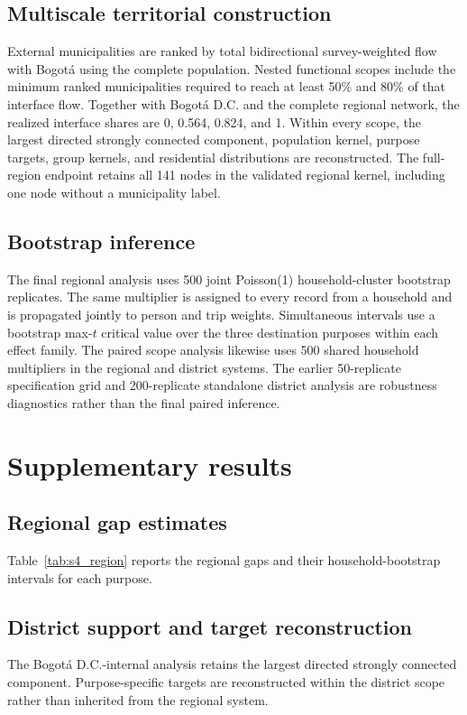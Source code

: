 \documentclass[11pt]{article}
\begin{document}



\subsection{Multiscale territorial construction}
External municipalities are ranked by total bidirectional survey-weighted flow with
Bogotá using the complete population. Nested functional scopes include the minimum
ranked municipalities required to reach at least 50\% and 80\% of that interface flow.
Together with Bogotá D.C. and the complete regional network, the realized interface
shares are 0, 0.564, 0.824, and 1. Within every scope, the largest directed strongly
connected component, population kernel, purpose targets, group kernels, and residential
distributions are reconstructed. The full-region endpoint retains all 141 nodes in the
validated regional kernel, including one node without a municipality label.

\subsection{Bootstrap inference}
The final regional analysis uses 500 joint Poisson(1) household-cluster bootstrap
replicates. The same multiplier is assigned to every record from a household and is
propagated jointly to person and trip weights. Simultaneous intervals use a bootstrap
max-$t$ critical value over the three destination purposes within each effect family.
The paired scope analysis likewise uses 500 shared household multipliers in the regional
and district systems. The earlier 50-replicate specification grid and 200-replicate
standalone district analysis are robustness diagnostics rather than the final paired
inference.

\section{Supplementary results}

\subsection{Regional gap estimates}
Table~\ref{tab:s4_region} reports the regional gaps and their household-bootstrap
intervals for each purpose.


\subsection{District support and target reconstruction}
The Bogotá D.C.-internal analysis retains the largest directed strongly connected
component. Purpose-specific targets are reconstructed within the district scope rather
than inherited from the regional system.
\end{document}
